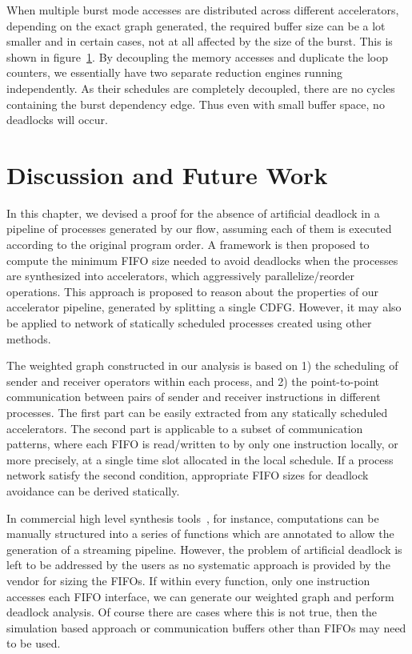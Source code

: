 When multiple burst mode accesses are distributed across different accelerators, 
depending on the exact graph generated, the required buffer size can be a lot smaller
and in certain cases, not at all affected by the size of the burst. This is shown in figure~\ref{}. By decoupling the memory accesses and duplicate the loop counters, we essentially have two separate reduction engines running independently. As their schedules are completely
decoupled, there are no cycles containing the burst dependency edge. Thus even with
small buffer space, no deadlocks will occur.

 

\section{Discussion and Future Work}
In this chapter, we devised a proof for the absence of artificial deadlock in a pipeline of processes
generated by our flow, assuming each of them is executed according to the original program order. A framework is then proposed to compute the minimum FIFO size needed to avoid deadlocks when the processes are synthesized into accelerators, which aggressively parallelize/reorder operations. This approach is proposed to reason about the properties of our accelerator pipeline, generated by
splitting a single CDFG. However, it may also be applied to network of statically scheduled processes
created using other methods.


The weighted graph constructed in our analysis is based on 1) the scheduling of sender and receiver operators within each process, and 2) the point-to-point communication between pairs of sender and receiver instructions in different processes.
The first part can be easily extracted from any statically scheduled accelerators. 
The second part is  applicable to a subset of communication patterns, where each FIFO is read/written to by only one instruction locally, or more precisely, at a single time slot allocated in the local schedule. 
If a process network satisfy the second condition, appropriate FIFO
sizes for deadlock avoidance can be derived statically.


In commercial high level synthesis tools~\cite{}, for instance, computations can be manually structured into a series of functions which are annotated to allow the generation of a streaming pipeline. However, the problem of artificial deadlock is left to be addressed by the users as no systematic approach is provided by the vendor for sizing the FIFOs. If within every function, only one instruction accesses each FIFO interface, we can generate our weighted graph and perform deadlock analysis. Of course there are cases where this is not true, then the simulation based approach or communication buffers other than FIFOs may need to be used.


